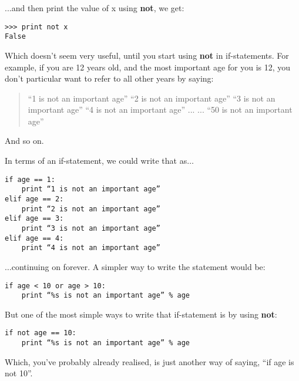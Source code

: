 ...and then print the value of x using \textbf{not}, we get:

\begin{listing}
\begin{verbatim}
>>> print not x
False
\end{verbatim}
\end{listing}

Which doesn't seem very useful, until you start using \textbf{not} in if-statements.  For example, if you are 12 years old, and the most important age for you is 12, you don't particular want to refer to all other years by saying:

\begin{quotation}
``1 is not an important age''
``2 is not an important age''
``3 is not an important age''
``4 is not an important age''
...
...
``50 is not an important age''
\end{quotation}

And so on.
\par\noindent
In terms of an if-statement, we could write that as$\ldots$

\begin{listing}
\begin{verbatim}
if age == 1:
    print “1 is not an important age”
elif age == 2:
    print “2 is not an important age”
elif age == 3:
    print “3 is not an important age”
elif age == 4:
    print “4 is not an important age”
\end{verbatim}
\end{listing}

\noindent
$\ldots$continuing on forever. A simpler way to write the statement would be:

\begin{listing}
\begin{verbatim}
if age < 10 or age > 10:
    print “%s is not an important age” % age
\end{verbatim}
\end{listing}

\noindent
But one of the most simple ways to write that if-statement is by using \textbf{not}:

\begin{listing}
\begin{verbatim}
if not age == 10:
    print “%s is not an important age” % age
\end{verbatim}
\end{listing}

\noindent
Which, you've probably already realised, is just another way of saying, ``if age is not 10''.

